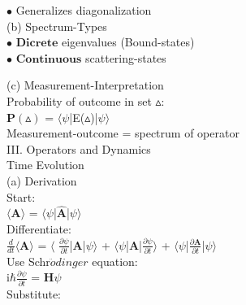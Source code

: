 \documentclass[a4paper, 10pt, onepage]{elegantbook}
\begin{document}
{$\bullet$ Generalizes diagonalization \\

(b) Spectrum-Types \\
 
$\bullet$ $\mathbf {Dicrete}$ eigenvalues (Bound-states) \\
 
$\bullet$ $\mathbf {Continuous}$ scattering-states  

(c) Measurement-Interpretation \\ 

Probability of outcome in set $\vartriangle$: \\
 
    $\mathbf {P}(\vartriangle)$ = $\langle \psi$|E($\vartriangle$)|$\psi \rangle$  \\

    Measurement-outcome = spectrum of operator  \\

III. Operators and Dynamics  \\  

Time Evolution  \\  

(a) Derivation \\ 

Start: \\
 
    $\langle \mathbf {A} \rangle$ = $\langle \psi$|$\mathbf {\hat A}$|$\psi \rangle$ \\ 

Differentiate: \\
 
$\frac{d}{dt} \langle \mathbf {A} \rangle$ = $\langle$ $\frac{\partial \psi}{\partial t}$|$\mathbf A$|$\psi \rangle$ + $\langle \psi$|$\mathbf A$|$\frac{\partial \psi}{\partial t} \rangle$ + $\langle \psi$|$\frac{\partial \mathbf A}{\partial t}$|$\psi \rangle$   \\   
        
Use Schr$\ddot{o}dinger$ equation:  \\
  
    i$\hbar \frac{\partial \psi}{\partial t}$ = $\mathbf H \psi$ \\ 
    
Substitute: \\
 
}
\end{document}
